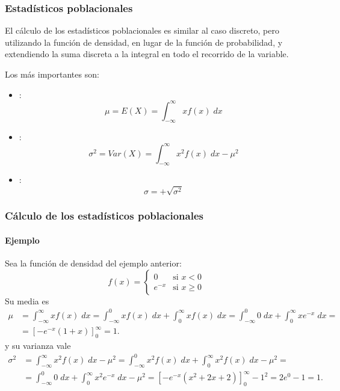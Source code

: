 \begin{frame}
\frametitle{Estadísticos poblacionales}
El cálculo de los estadísticos poblacionales es similar al caso discreto, pero utilizando la función de densidad, en lugar de la función de
probabilidad, y extendiendo la suma discreta a la integral en todo el recorrido de la variable.

Los más importantes son:
\begin{itemize}
\item {}:
\[
\mu = E(X) = \int_{-\infty}^\infty x f(x)\; dx
\]
\item {}:
\[
\sigma^2 = Var(X) = \int_{-\infty}^\infty x^2f(x)\; dx -\mu^2
\]
\item {}:
\[
\sigma = +\sqrt{\sigma^2}
\] 
\end{itemize}

\end{frame}


\begin{frame}
\frametitle{Cálculo de los estadísticos poblacionales}
\framesubtitle{Ejemplo}
Sea la función de densidad del ejemplo anterior:
\[
f(x) = 
\begin{cases}
0 & \mbox{si $x<0$}\\
e^{-x} & \mbox{si $x\geq 0$}
\end{cases}
\]
Su media es
\begin{align*}
\mu &= \int_{-\infty}^\infty xf(x)\;dx = \int_{-\infty}^0 xf(x)\;dx +\int_0^\infty xf(x)\;dx = \int_{-\infty}^0 0\;dx +\int_0^\infty xe^{-x}\;dx =\\
&= \left[-e^{-x}(1+x)\right]_0^{\infty} = 1.
\end{align*}
y su varianza vale
\begin{align*}
\sigma^2 &= \int_{-\infty}^\infty x^2f(x)\;dx -\mu^2 = \int_{-\infty}^0 x^2f(x)\;dx +\int_0^\infty x^2f(x)\;dx -\mu^2 = \\
&= \int_{-\infty}^0 0\;dx +\int_0^\infty x^2e^{-x}\;dx -\mu^2= \left[-e^{-x}(x^2+2x+2)\right]_0^{\infty} - 1^2= 2e^0-1 = 1.
\end{align*}

\end{frame}



